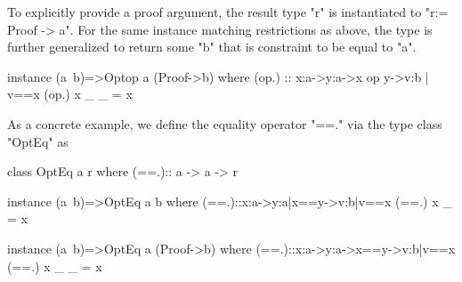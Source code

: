 %
To explicitly provide a proof argument,
the result type "r" is instantiated to "r:= Proof -> a".
%
For the same instance matching restrictions as above,
the type is further generalized to return some "b"
that is constraint to be equal to "a".
%
\begin{code}
  instance (a~b)=>Optop a (Proof->b) where
  (op.) :: x:a->y:a->{x op y}->{v:b | v==x }
  (op.) x _ _ = x
\end{code}
%
As a concrete example, we define the equality operator "==."
via the type class "OptEq" as
\begin{code}
  class OptEq a r where
   (==.):: a -> a -> r

  instance (a~b)=>OptEq a b where
   (==.)::x:a->y:{a|x==y}->{v:b|v==x}
   (==.) x _ = x

  instance (a~b)=>OptEq a (Proof->b) where
   (==.)::x:a->y:a->{x==y}->{v:b|v==x}
   (==.) x _ _ = x
\end{code}

